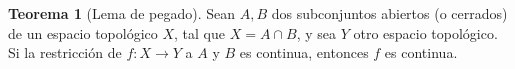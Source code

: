 \documentclass[10pt]{report}
\newcommand{\R}{\mathbb{R}}
\newcommand{\enfatiza}[1]{\textbf{\textit{#1}}}
\theoremstyle{definition}
\newtheorem{defin}{Definición}[section]
\newtheorem{tma}[defin]{Teorema}
\begin{document}
\begin{tma}[Lema de pegado]
Sean $A,B$ dos subconjuntos abiertos (o cerrados) de un espacio topológico $X$, tal que $X=A\cap B$, y sea $Y$ otro espacio topológico. Si la restricción de $f:X\to Y$ a $A$ y $B$ es continua, entonces $f$ es continua.
\end{tma}

\end{document}
